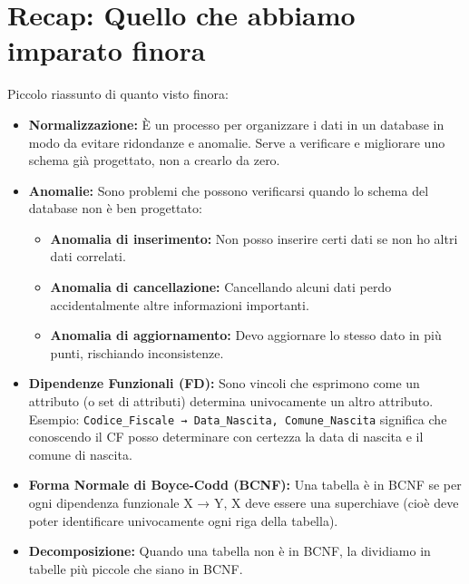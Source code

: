 	\section{Recap: Quello che abbiamo imparato finora}
	
	Piccolo riassunto di quanto visto finora:
	
	\begin{itemize}
		\item \textbf{Normalizzazione:} È un processo per organizzare i dati in un database in modo da evitare ridondanze e anomalie. Serve a verificare e migliorare uno schema già progettato, non a crearlo da zero.
		
		\item \textbf{Anomalie:} Sono problemi che possono verificarsi quando lo schema del database non è ben progettato:
		\begin{itemize}
			\item \textbf{Anomalia di inserimento:} Non posso inserire certi dati se non ho altri dati correlati.
			\item \textbf{Anomalia di cancellazione:} Cancellando alcuni dati perdo accidentalmente altre informazioni importanti.
			\item \textbf{Anomalia di aggiornamento:} Devo aggiornare lo stesso dato in più punti, rischiando inconsistenze.
		\end{itemize}
		
		\item \textbf{Dipendenze Funzionali (FD):} Sono vincoli che esprimono come un attributo (o set di attributi) determina univocamente un altro attributo. Esempio: \texttt{Codice\_Fiscale → Data\_Nascita, Comune\_Nascita} significa che conoscendo il CF posso determinare con certezza la data di nascita e il comune di nascita.
		
		\item \textbf{Forma Normale di Boyce-Codd (BCNF):} Una tabella è in BCNF se per ogni dipendenza funzionale X → Y, X deve essere una superchiave (cioè deve poter identificare univocamente ogni riga della tabella).
		
		\item \textbf{Decomposizione:} Quando una tabella non è in BCNF, la dividiamo in tabelle più piccole che siano in BCNF.
		

\end{itemize}
